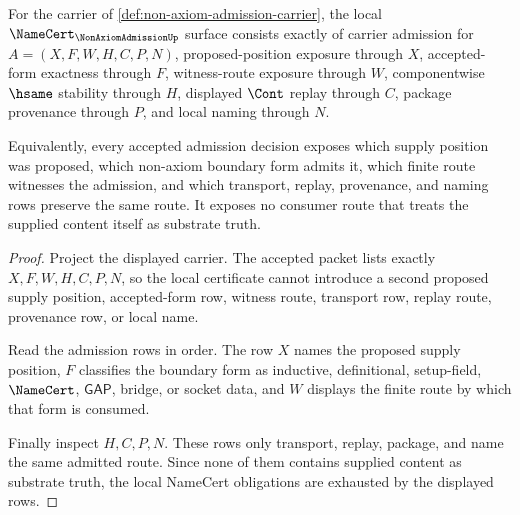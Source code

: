 \begin{theorem}
\label{thm:non-axiom-admission-namecert-obligations}
For the carrier of \autoref{def:non-axiom-admission-carrier}, the local $\NameCert_{\NonAxiomAdmissionUp}$ surface consists exactly of carrier admission for $A=(X,F,W,H,C,P,N)$, proposed-position exposure through $X$, accepted-form exactness through $F$, witness-route exposure through $W$, componentwise $\hsame$ stability through $H$, displayed $\Cont$ replay through $C$, package provenance through $P$, and local naming through $N$.

Equivalently, every accepted admission decision exposes which supply position was proposed, which non-axiom boundary form admits it, which finite route witnesses the admission, and which transport, replay, provenance, and naming rows preserve the same route. It exposes no consumer route that treats the supplied content itself as substrate truth.
\end{theorem}
\begin{proof}
Project the displayed carrier. The accepted packet lists exactly $X,F,W,H,C,P,N$, so the local certificate cannot introduce a second proposed supply position, accepted-form row, witness route, transport row, replay route, provenance row, or local name.

Read the admission rows in order. The row $X$ names the proposed supply position, $F$ classifies the boundary form as inductive, definitional, setup-field, $\NameCert$, $\mathsf{GAP}$, bridge, or socket data, and $W$ displays the finite route by which that form is consumed.

Finally inspect $H,C,P,N$. These rows only transport, replay, package, and name the same admitted route. Since none of them contains supplied content as substrate truth, the local NameCert obligations are exhausted by the displayed rows.
\end{proof}

